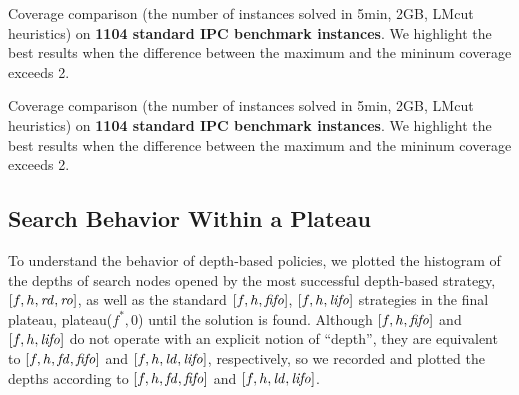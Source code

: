 
\begin{table}[htbp]
 {
 \centering
 
 \caption{
 Coverage comparison (the number of instances solved in 5min, 2GB, LMcut
 heuristics) on \textbf{1104 standard IPC benchmark instances}. We highlight the
 best results when the difference between the maximum and the mininum coverage exceeds 2.
 }
 \label{tbl:lmcut-ipc-noh}
 }
\end{table}
\begin{table}[htbp]
 {
 \centering
 
 \caption{
 Coverage comparison (the number of instances solved in 5min, 2GB, LMcut
 heuristics) on \textbf{1104 standard IPC benchmark instances}. We highlight the
 best results when the difference between the maximum and the mininum coverage exceeds 2.
 }
 \label{tbl:mands-ipc-noh}
 }
\end{table}





\subsection{Search Behavior Within a Plateau}

To understand the behavior of depth-based policies, we plotted the histogram of
the depths of search nodes opened by
the most successful depth-based strategy, $[f,h,{\mbox{\textit{rd}}},{\mbox{\textit{ro}}}]$, as well as 
the standard $[f,h,{\mbox{\textit{fifo}}}]$, $[f,h,{\mbox{\textit{lifo}}}]$ strategies
in the final plateau, plateau($f^*,0$) until the solution is found.
% 
Although $[f,h,{\mbox{\textit{fifo}}}]$ and $[f,h,{\mbox{\textit{lifo}}}]$ do not operate with an explicit notion of ``depth'', 
they are equivalent to $[f,h,{\mbox{\textit{fd}}},{\mbox{\textit{fifo}}}]$ and $[f,h,{\mbox{\textit{ld}}},{\mbox{\textit{lifo}}}]$, respectively,
so we recorded and plotted the depths according to  $[f,h,{\mbox{\textit{fd}}},{\mbox{\textit{fifo}}}]$ and $[f,h,{\mbox{\textit{ld}}},{\mbox{\textit{lifo}}}]$.


